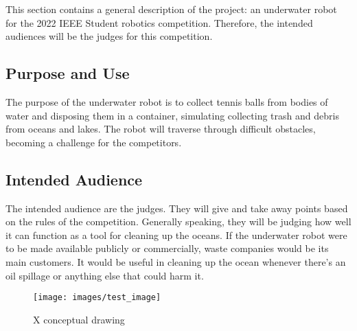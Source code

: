This section contains a general description of the project: an underwater robot for the 2022 IEEE Student robotics competition. Therefore, the intended audiences will be the judges for this competition. 

\subsection{Purpose and Use}
The purpose of the underwater robot is to collect tennis balls from bodies of water and disposing them in a container, simulating collecting trash and debris from oceans and lakes. The robot will traverse through difficult obstacles, becoming a challenge for the competitors. 

\subsection{Intended Audience}
The intended audience are the judges. They will give and take away points based on the rules of the competition. Generally speaking, they will be judging how well it can function as a tool for cleaning up the oceans. If the underwater robot were to be made available publicly or commercially, waste companies would be its main customers. It would be useful in cleaning up the ocean whenever there's an oil spillage or anything else that could harm it. 

\begin{figure}[h!]
	\centering
   	\texttt{[image: images/test\_image]}
    \caption{X conceptual drawing}
\end{figure}
